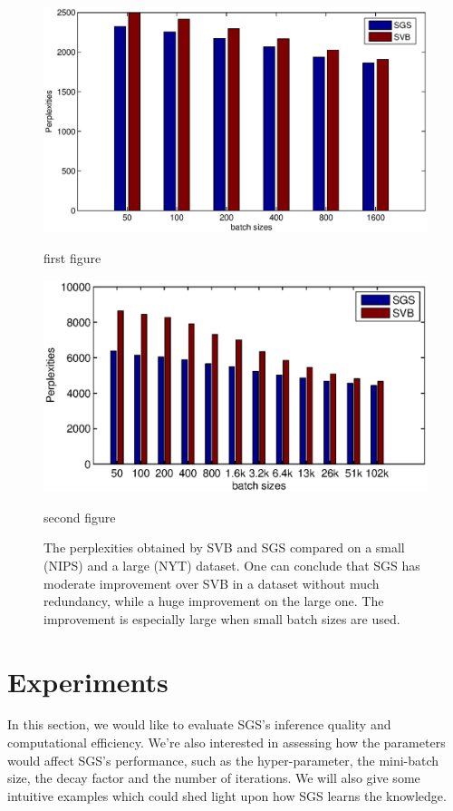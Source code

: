 \documentclass{article} %
\begin{document}
\begin{figure}
\centering
\begin{minipage}{0.45\textwidth}
\centering
\includegraphics[width=\columnwidth]{pics/batch_NIPS.eps} 
\caption{first figure}
\end{minipage}\hfill
\begin{minipage}{0.45\textwidth}
\centering
\includegraphics[width=\columnwidth]{pics/batch_NYT.eps} 
\caption{second figure}
\end{minipage}

\caption{ The perplexities obtained by SVB and SGS compared on a small (NIPS) and a large (NYT) dataset. One can conclude that SGS has moderate improvement over SVB in a dataset without much redundancy, while a huge improvement on the large one. The improvement is especially large when small batch sizes are used.}    
\label{fig:batch}    

\end{figure}


\section{Experiments}
In this section, we would like to evaluate SGS's inference quality and computational efficiency. We're also interested in assessing how the parameters would affect SGS's performance, such as the hyper-parameter, the mini-batch size, the decay factor and the number of iterations. We will also give some intuitive examples which could shed light upon how SGS learns the knowledge.
\end{document}
